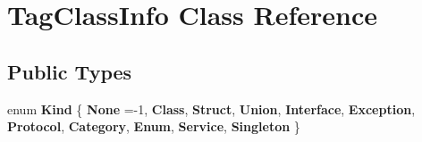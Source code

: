 \hypertarget{class_tag_class_info}{}\section{Tag\+Class\+Info Class Reference}
\label{class_tag_class_info}
\subsection*{Public Types}
\begin{DoxyCompactItemize}
\item 
\mbox{\label{class_tag_class_info_accc1e7a47f78728ae2d5da7b06a1244e}} 
enum {\bfseries Kind} \{ \newline
{\bfseries None} =-\/1, 
{\bfseries Class}, 
{\bfseries Struct}, 
{\bfseries Union}, 
\newline
{\bfseries Interface}, 
{\bfseries Exception}, 
{\bfseries Protocol}, 
{\bfseries Category}, 
\newline
{\bfseries Enum}, 
{\bfseries Service}, 
{\bfseries Singleton}
 \}
\end{DoxyCompactItemize}
